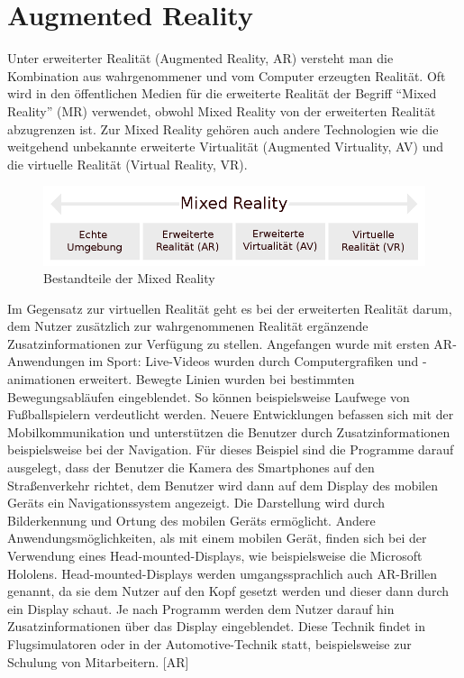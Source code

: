\documentclass[11pt, titlepage, fleqn]{report}
\begin{document}
        \section{Augmented Reality}
        \label{sec:2.1}
            Unter erweiterter Realität (Augmented Reality, AR) versteht man die Kombination aus wahrgenommener und vom Computer erzeugten Realität.
            Oft wird in den öffentlichen Medien für die erweiterte Realität der Begriff “Mixed Reality” (MR) verwendet, obwohl Mixed Reality von der erweiterten 
            Realität abzugrenzen ist. Zur Mixed Reality gehören auch andere Technologien wie die weitgehend unbekannte erweiterte Virtualität (Augmented Virtuality, 
            AV) und die virtuelle Realität (Virtual Reality, VR).
            \begin{figure}[htbp]
                \centering
                \includegraphics[width=\linewidth]{./img/Mixed_Reality.png}
                \caption{Bestandteile der Mixed Reality \label{fig:MRPic}}
            \end{figure}
            \newline Im Gegensatz zur virtuellen Realität geht es bei der erweiterten Realität darum, dem Nutzer zusätzlich zur wahrgenommenen Realität ergänzende 
            Zusatzinformationen zur Verfügung zu stellen.
            Angefangen wurde mit ersten AR-Anwendungen im Sport: Live-Videos wurden durch Computergrafiken und -animationen erweitert. 
            Bewegte Linien wurden bei bestimmten Bewegungsabläufen eingeblendet. So können beispielsweise Laufwege von Fußballspielern verdeutlicht werden.
            \newline Neuere Entwicklungen befassen sich mit der Mobilkommunikation und unterstützen die Benutzer durch Zusatzinformationen beispielsweise bei der Navigation.
            Für dieses Beispiel sind die Programme darauf ausgelegt, dass der Benutzer die Kamera des Smartphones auf den Straßenverkehr richtet, dem Benutzer wird 
            dann auf dem Display des mobilen Geräts ein Navigationssystem angezeigt. Die Darstellung wird durch Bilderkennung und Ortung des mobilen Geräts ermöglicht.
            Andere Anwendungsmöglichkeiten, als mit einem mobilen Gerät, finden sich bei der Verwendung eines Head-mounted-Displays, wie beispielsweise die Microsoft 
            Hololens.\newline
            Head-mounted-Displays werden umgangssprachlich auch AR-Brillen genannt, da sie dem Nutzer auf den Kopf gesetzt werden und dieser dann durch ein Display 
            schaut. Je nach Programm werden dem Nutzer darauf hin Zusatzinformationen über das Display eingeblendet. Diese Technik findet in Flugsimulatoren oder in der 
            Automotive-Technik statt, beispielsweise zur Schulung von Mitarbeitern.  [AR]
\end{document}
